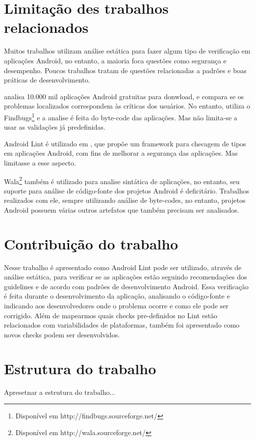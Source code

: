 \section{Limitação des trabalhos relacionados}
Muitos trabalhos utilizam análise estática para fazer algum tipo de verificação
em aplicações Android, no entanto, a maioria foca questões como segurança e
desempenho. Poucos trabalhos tratam de questões relacionadas a padrões e boas
práticas de desenvolvimento.

\cite{findbug_10k} analisa 10.000 mil aplicações Android gratuitas para donwload,
e compara se os problemas localizados correspondem às críticas dos usuários. No
entanto, utiliza o Findbugs\footnote{Disponível em http://findbugs.sourceforge.net/}
e a analise é feita do byte-code das aplicações. Mas não limita-se a usar as validações
já predefinidas.

Android Lint é utilizado em \cite{lintent}, que propõe um framework para checagem
de tipos em aplicações Android, com fins de melhorar a segurança das aplicações.
Mas limitasse a esse aspecto.

Wala\footnote{Disponível em http://wala.sourceforge.net/} também é utilizado para
analise sintática de aplicações, no entanto, seu suporte para análise de código-fonte
dos projetos Android é deficitário. Trabalhos realizados com ele, sempre utilizando
análise de byte-codes, no entanto, projetos Android possuem várias outros artefatos 
que também precisam ser analisados.

\section{Contribuição do trabalho}
Nesse trabalho é apresentado como Android Lint pode ser utilizado, através de análise
estática, para verificar se as aplicações estão seguindo recomendações dos guidelines
e de acordo com padrões de desenvolvimento Android. Essa verificação é feita durante
o desenvolvimento da aplicação, analisando o código-fonte e indicando aos desenvolvedores
onde o problema ocorre e como ele pode ser corrigido. Além de mapearmos quais checks
pre-definidos no Lint estão relacionados com variabilidades de plataformas, também
foi apresentado como novos checks podem ser desenvolvidos.

\section{Estrutura do trabalho}
Apresetnar a estrutura do trabalho...
